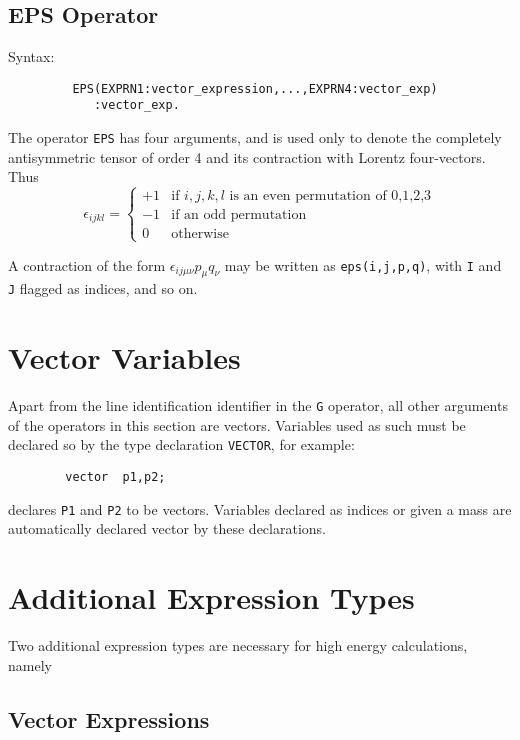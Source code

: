 \subsection{EPS Operator}
Syntax:
\begin{verbatim}
         EPS(EXPRN1:vector_expression,...,EXPRN4:vector_exp)
            :vector_exp.
\end{verbatim}
The operator {\tt EPS} has four arguments, and is used only to denote the
completely antisymmetric tensor of order 4 and its contraction with Lorentz
four-vectors. Thus
\[ \epsilon_{i j k l} = \left\{ \begin{array}{cl}
                                +1 & \mbox{if $i,j,k,l$ is an even permutation
                                              of 0,1,2,3} \\
                                -1 & \mbox{if an odd permutation} \\
                                0 & \mbox{otherwise}
                              \end{array}
                      \right. \]

A contraction of the form $\epsilon_{i j \mu \nu}p_{\mu}q_{\nu}$ may be
written as {\tt eps(i,j,p,q)}, with {\tt I} and {\tt J} flagged as indices,
and so on.

\section{Vector Variables}

Apart from the line identification identifier in the {\tt G} operator, all
other arguments of the operators in this section are vectors.  Variables
used as such must be declared so by the type declaration {\tt VECTOR},
 for example:
\begin{verbatim}
        vector  p1,p2;
\end{verbatim}
declares {\tt P1} and {\tt P2} to be vectors.  Variables declared as
indices or given a mass are automatically declared
vector by these declarations.

\section{Additional Expression Types}

Two additional expression types are necessary for high energy
calculations, namely

\subsection{Vector Expressions}

